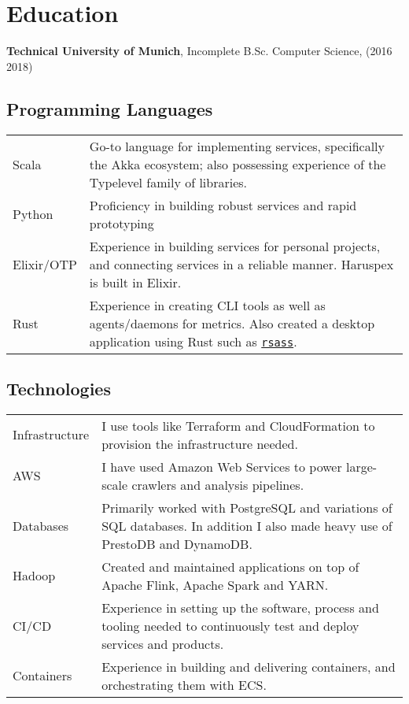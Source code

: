 \documentclass[a4paper]{article}
\renewenvironment{itemize}{
  \begin{list}{}{
      \setlength{\leftmargin}{1.5em}
      \setlength{\itemsep}{10pt}
  }
}{
  \end{list}
}
\begin{document}
\section*{Education}

\begin{itemize}
  \item \textbf{Technical University of Munich}, Incomplete B.Sc. Computer Science,  (2016
    {\textendash} 2018)
\end{itemize}

\subsection*{Programming Languages}
\begin{tabular}{ p{2.75cm} | p{14cm} }
Scala & Go-to language for implementing services, specifically the Akka ecosystem;
also possessing experience of the Typelevel family of libraries.\\
Python & Proficiency in building robust services and rapid prototyping \\
Elixir/OTP & Experience in building services for personal projects, and
connecting services in a reliable manner. Haruspex is built in Elixir.\\
Rust & Experience in creating CLI tools as well as agents/daemons for
metrics. Also created a desktop application using Rust such as
\href{https://github.com/mordecaimalignatus/rsass}{\tt rsass}. \\
\end{tabular}

\subsection*{Technologies}
\begin{tabular}{ p{2.75cm} | p{14cm} }
Infrastructure & I use tools like Terraform and CloudFormation to
provision the infrastructure needed. \\
AWS & I have used Amazon Web Services to power large-scale crawlers and analysis
pipelines. \\
Databases & Primarily worked with PostgreSQL and variations of SQL
databases. In addition I also made heavy use of PrestoDB and DynamoDB.\\
Hadoop & Created and maintained applications on top of Apache Flink,
Apache Spark and YARN.\\
CI/CD & Experience in setting up the software, process and tooling needed
to continuously test and deploy services and products.\\
Containers & Experience in building and delivering containers, and orchestrating
them with ECS.
\end{tabular}
\end{document}
